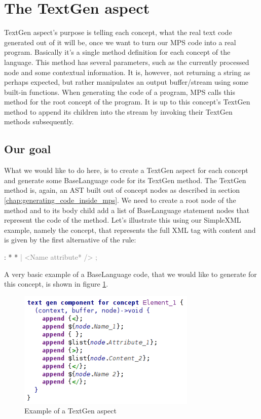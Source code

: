 \section{The TextGen aspect}
\label{chap:textgen}

TextGen aspect's purpose is telling each concept, what the real text code generated out of it will be, once we want to turn our MPS code into a real program.
Basically it's a single method definition for each concept of the language.
This method has several parameters, such as the currently processed node and some contextual information.
It is, however, not returning a string as perhaps expected, but rather manipulates an output buffer/stream using some built-in functions.
When generating the code of a program, MPS calls this method for the root concept of the program.
It is up to this concept's TextGen method to append its children into the stream by invoking their TextGen methods subsequently.

\subsection{Our goal}

What we would like to do here, is to create a TextGen aspect for each concept and generate some BaseLanguage code for its TextGen method.
The TextGen method is, again, an AST built out of concept nodes as described in section \ref{chap:generating_code_inside_mps}.
We need to create a root node of the method and to its body child add a list of BaseLanguage statement nodes that represent the code of the method.
Let's illustrate this using our SimpleXML example, namely the  concept, that represents the full XML tag with content and is given by the first alternative of the  rule:

\begin{antlr}
	   :   \literal{<}  * \literal{>} * \literal{</}  \literal{>}
          \textcolor{gray}{|   \ap<\ap Name attribute* \ap/>\ap}
          \textcolor{gray}{;}
\end{antlr}

A very basic example of a BaseLanguage code, that we would like to generate for this concept, is shown in figure \ref{fig:textgen_example}.

\begin{figure}[h]
	\centering
	\includegraphics[width=85mm]{./img/textgen_example.png}
	\caption{Example of a TextGen aspect}
	\label{fig:textgen_example}
\end{figure}

